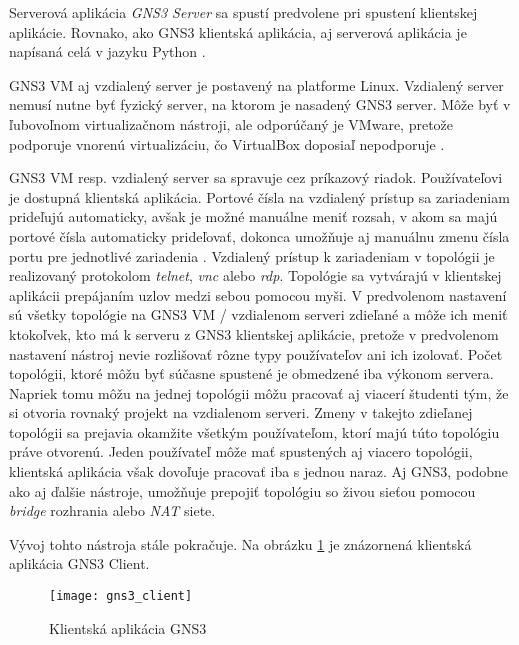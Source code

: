Serverová aplikácia \emph{GNS3 Server} sa spustí predvolene pri spustení klientskej aplikácie. Rovnako, ako GNS3 klientská aplikácia, aj serverová aplikácia je napísaná celá v jazyku Python \cite{gns3_server_github}.

GNS3 VM aj vzdialený server je postavený na platforme Linux. Vzdialený server nemusí nutne byť fyzický server, na ktorom je nasadený GNS3 server. Môže byť v ľubovoľnom virtualizačnom nástroji, ale odporúčaný je VMware, pretože podporuje vnorenú virtualizáciu, čo VirtualBox doposiaľ nepodporuje \cite{nested_virtualization}.

GNS3 VM resp. vzdialený server sa spravuje cez príkazový riadok. Používateľovi je dostupná klientská aplikácia. Portové čísla na vzdialený prístup sa zariadeniam prideľujú automaticky, avšak je možné manuálne meniť rozsah, v akom sa majú portové čísla automaticky prideľovať, dokonca umožňuje aj manuálnu zmenu čísla portu pre jednotlivé zariadenia \cite{gns3_console_ports, gns3_console_ports_remote}. Vzdialený prístup k zariadeniam v topológii je realizovaný protokolom \emph{telnet}, \emph{vnc} alebo \emph{rdp}. Topológie sa vytvárajú v klientskej aplikácii prepájaním uzlov medzi sebou pomocou myši. V predvolenom nastavení sú všetky topológie na GNS3 VM / vzdialenom serveri zdieľané a môže ich meniť ktokoľvek, kto má k serveru z GNS3 klientskej aplikácie, pretože v predvolenom nastavení nástroj nevie rozlišovať rôzne typy používateľov ani ich izolovať. Počet topológii, ktoré môžu byť súčasne spustené je obmedzené iba výkonom servera. Napriek tomu môžu na jednej topológii môžu pracovať aj viacerí študenti tým, že si otvoria rovnaký projekt na vzdialenom serveri. Zmeny v takejto zdieľanej topológii sa prejavia okamžite všetkým používateľom, ktorí majú túto topológiu práve otvorenú. Jeden používateľ môže mať spustených aj viacero topológii, klientská aplikácia však dovoľuje pracovať iba s jednou naraz. Aj GNS3, podobne ako aj ďalšie nástroje, umožňuje prepojiť topológiu so živou sieťou pomocou \emph{bridge} rozhrania alebo \emph{NAT} siete.

Vývoj tohto nástroja stále pokračuje. Na obrázku \ref{obr:gns3_client} je znázornená klientská aplikácia GNS3 Client.

\begin{figure}
    \centering
    \texttt{[image: gns3\_client]}
    \caption{Klientská aplikácia GNS3}
    \label{obr:gns3_client}
\end{figure}





